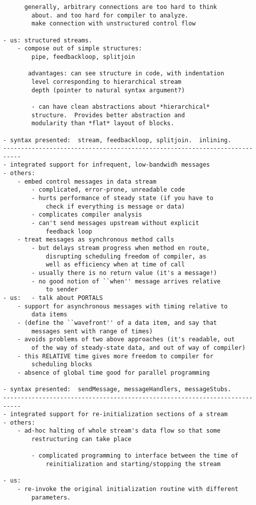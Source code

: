 \begin{verbatim}
	  generally, arbitrary connections are too hard to think
		about. and too hard for compiler to analyze.
		make connection with unstructured control flow

- us: structured streams.
	- compose out of simple structures:  
		pipe, feedbackloop, splitjoin

	   advantages: can see structure in code, with indentation
		level corresponding to hierarchical stream
		depth (pointer to natural syntax argument?)

		- can have clean abstractions about *hierarchical*
		structure.  Provides better abstraction and
		modularity than *flat* layout of blocks.

- syntax presented:  stream, feedbackloop, splitjoin.  inlining.
---------------------------------------------------------------------------
- integrated support for infrequent, low-bandwidh messages
- others:
	- embed control messages in data stream
		- complicated, error-prone, unreadable code
		- hurts performance of steady state (if you have to 
			check if everything is message or data)
		- complicates compiler analysis
		- can't send messages upstream without explicit
			feedback loop
	- treat messages as synchronous method calls
		- but delays stream progress when method en route, 
			disrupting scheduling freedom of compiler, as
			well as efficiency when at time of call
		- usually there is no return value (it's a message!)
		- no good notion of ``when'' message arrives relative
			to sender
- us: 	- talk about PORTALS
	- support for asynchronous messages with timing relative to
		data items
	- (define the ``wavefront'' of a data item, and say that
		messages sent with range of times)
	- avoids problems of two above approaches (it's readable, out
		of the way of steady-state data, and out of way of compiler)
	- this RELATIVE time gives more freedom to compiler for
		scheduling blocks
	- absence of global time good for parallel programming

- syntax presented:  sendMessage, messageHandlers, messageStubs.
---------------------------------------------------------------------------
- integrated support for re-initialization sections of a stream
- others:	
	- ad-hoc halting of whole stream's data flow so that some
		restructuring can take place
		
		- complicated programming to interface between the time of
			reinitialization and starting/stopping the stream

- us:
	- re-invoke the original initialization routine with different 
		parameters.


\end{verbatim}
